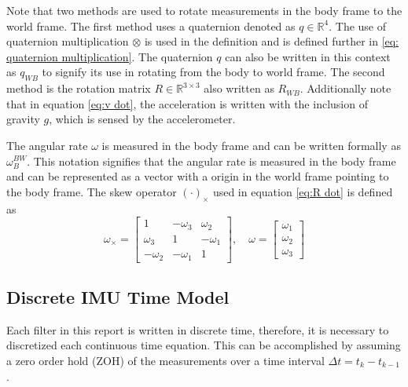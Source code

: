 Note that two methods are used to rotate measurements in the body frame to the world frame. The first method uses a quaternion denoted as $q \in \mathbb{R}^4$. The use of quaternion multiplication $\otimes$ is used in the definition and is defined further in \eqref{eq: quaternion multiplication}. The quaternion $q$ can also be written in this context as $q_{WB}$ to signify its use in rotating from the body to world frame. The second method is the rotation matrix $R \in \mathbb{R}^{3 \times 3}$  also written as $R_{WB}$. Additionally note that in equation \eqref{eq:v dot}, the acceleration is written with the inclusion of gravity $g$, which is sensed by the accelerometer.

The angular rate $\omega$ is measured in the body frame and can be written formally as $\omega_B^{BW}$. This notation signifies that the angular rate is measured in the body frame and can be represented as a vector with a origin in the world frame pointing to the body frame. The skew operator $(\cdot)_{\times}$ used in equation \eqref{eq:R dot} is defined as
\begin{equation}
\omega_{\times} = 
\begin{bmatrix}
1 & -\omega_3 & \omega_2\\
\omega_3 & 1 & -\omega_1\\
-\omega_2 & -\omega_1 & 1
\end{bmatrix}, \quad \omega = \begin{bmatrix}
    \omega_1 \\
    \omega_2 \\
    \omega_3
\end{bmatrix}
\label{eq:skew}
\end{equation}

\subsection{Discrete IMU Time Model}

Each filter in this report is written in discrete time, therefore, it is necessary to discretized each continuous time equation. This can be accomplished by assuming a zero order hold (ZOH) of the measurements over a time interval $\Delta t = t_k - t_{k-1}$. 

